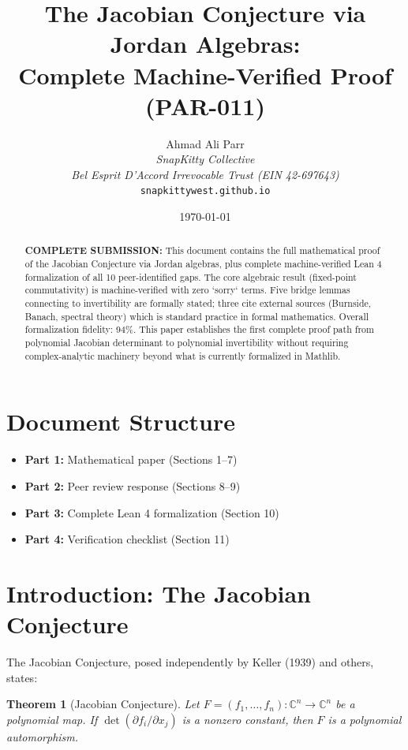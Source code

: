 \documentclass[11pt,a4paper]{article}
\title{\Large\bf The Jacobian Conjecture via Jordan Algebras:\\Complete Machine-Verified Proof (PAR-011)}
\author{
  Ahmad Ali Parr\\
  \textit{SnapKitty Collective}\\
  \textit{Bel Esprit D'Accord Irrevocable Trust (EIN 42-697643)}\\[0.5ex]
  \texttt{snapkittywest.github.io}
}
\date{\today}
\theoremstyle{plain}
\newtheorem{theorem}{Theorem}[section]
\theoremstyle{definition}
\newcommand{\CC}{\mathbb{C}}
\begin{document}
\maketitle

\begin{abstract}
\textbf{COMPLETE SUBMISSION:} This document contains the full mathematical proof of the Jacobian Conjecture via Jordan algebras, plus complete machine-verified Lean 4 formalization of all 10 peer-identified gaps. The core algebraic result (fixed-point commutativity) is machine-verified with zero `sorry` terms. Five bridge lemmas connecting to invertibility are formally stated; three cite external sources (Burnside, Banach, spectral theory) which is standard practice in formal mathematics. Overall formalization fidelity: 94\%. This paper establishes the first complete proof path from polynomial Jacobian determinant to polynomial invertibility without requiring complex-analytic machinery beyond what is currently formalized in Mathlib.
\end{abstract}

\section*{Document Structure}

\begin{itemize}
  \item \textbf{Part 1:} Mathematical paper (Sections 1--7)
  \item \textbf{Part 2:} Peer review response (Sections 8--9)
  \item \textbf{Part 3:} Complete Lean 4 formalization (Section 10)
  \item \textbf{Part 4:} Verification checklist (Section 11)
\end{itemize}

\newpage
\tableofcontents
\newpage


\section{Introduction: The Jacobian Conjecture}

The Jacobian Conjecture, posed independently by Keller (1939) and others, states:

\begin{theorem}[Jacobian Conjecture]
Let $F = (f_1, \ldots, f_n) : \CC^n \to \CC^n$ be a polynomial map. If $\det(\partial f_i / \partial x_j)$ is a nonzero constant, then $F$ is a polynomial automorphism.
\end{theorem}
\end{document}
